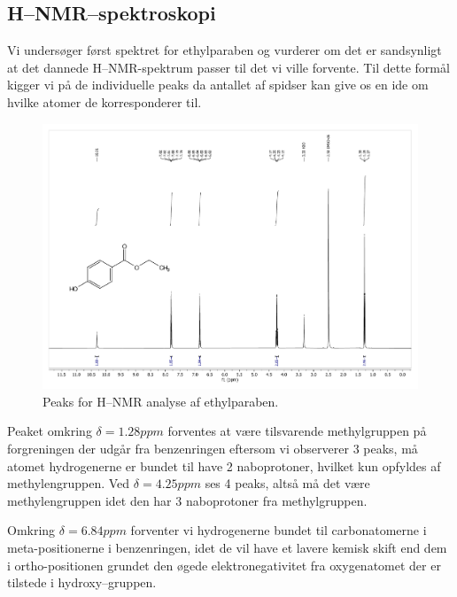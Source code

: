     \subsection{H--NMR--spektroskopi}
    Vi undersøger først spektret for ethylparaben og vurderer om det er sandsynligt at det dannede H--NMR-spektrum passer til det vi ville forvente. Til dette formål kigger vi på de individuelle peaks da antallet af spidser kan give os en ide om hvilke atomer de korresponderer til.
    \begin{figure}[H] \centering
        \includegraphics[width=\textwidth,page=2]{bilag/ethylnmr}
        \caption{Peaks for H--NMR analyse af ethylparaben.}
    \end{figure} 
    Peaket omkring $\delta=1.28\si{ppm}$ forventes at være tilsvarende methylgruppen på forgreningen der udgår fra benzenringen eftersom vi observerer 3 peaks, må atomet hydrogenerne er bundet til have 2 naboprotoner, hvilket kun opfyldes af methylengruppen. Ved $\delta=4.25\si{ppm}$ ses 4 peaks, altså må det være methylengruppen idet den har 3 naboprotoner fra methylgruppen. 
    
    Omkring $\delta=6.84\si{ppm}$ forventer vi hydrogenerne bundet til carbonatomerne i meta-positionerne i benzenringen, idet de vil have et lavere kemisk skift end dem i ortho-positionen grundet den øgede elektronegativitet fra oxygenatomet der er tilstede i hydroxy--gruppen.

